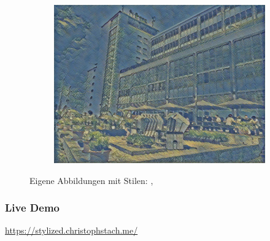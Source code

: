 \begin{frame}
\begin{figure}[H]
\begin{subfigure}[h]{0.32\textwidth}
            \includegraphics[width=\textwidth]{resources/content/experiments/htw-vgg16_the_olive_trees.jpg}
        \end{subfigure}
    
        \caption{Eigene Abbildungen mit Stilen: \cite{teal_and_black_abstract_painting_img}, \cite{the_olive_trees_img}}
        \label{img:trained_models3}
    \end{figure}
    

\end{frame}


\begin{frame}
    \frametitle{Live Demo}

    \centering
    \url{https://stylized.christophstach.me/}
\end{frame}
